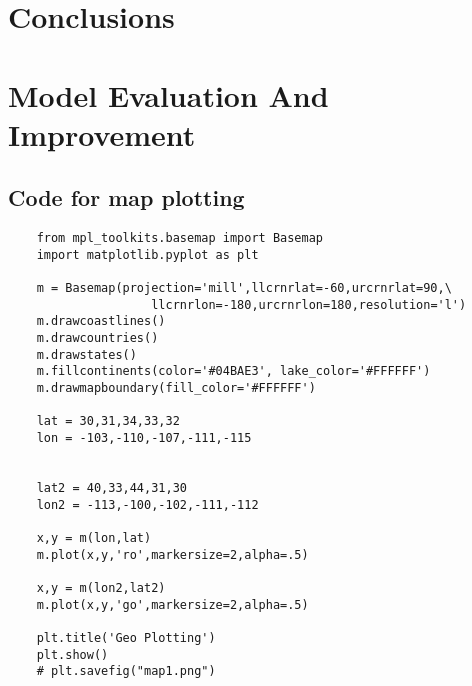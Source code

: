 \documentclass{mcmthesis}
\begin{document}
\section{Conclusions}
  

\section{Model Evaluation And Improvement}
  


\newpage






\newpage
\begin{appendices}
  
	\section{Code for map plotting}
  
  \begin{verbatim}
    from mpl_toolkits.basemap import Basemap
    import matplotlib.pyplot as plt

    m = Basemap(projection='mill',llcrnrlat=-60,urcrnrlat=90,\
                    llcrnrlon=-180,urcrnrlon=180,resolution='l')
    m.drawcoastlines()
    m.drawcountries()
    m.drawstates()
    m.fillcontinents(color='#04BAE3', lake_color='#FFFFFF')
    m.drawmapboundary(fill_color='#FFFFFF')

    lat = 30,31,34,33,32
    lon = -103,-110,-107,-111,-115


    lat2 = 40,33,44,31,30
    lon2 = -113,-100,-102,-111,-112

    x,y = m(lon,lat)
    m.plot(x,y,'ro',markersize=2,alpha=.5)

    x,y = m(lon2,lat2)
    m.plot(x,y,'go',markersize=2,alpha=.5)

    plt.title('Geo Plotting')
    plt.show()
    # plt.savefig("map1.png")
  \end{verbatim}

\end{appendices}
\end{document}
